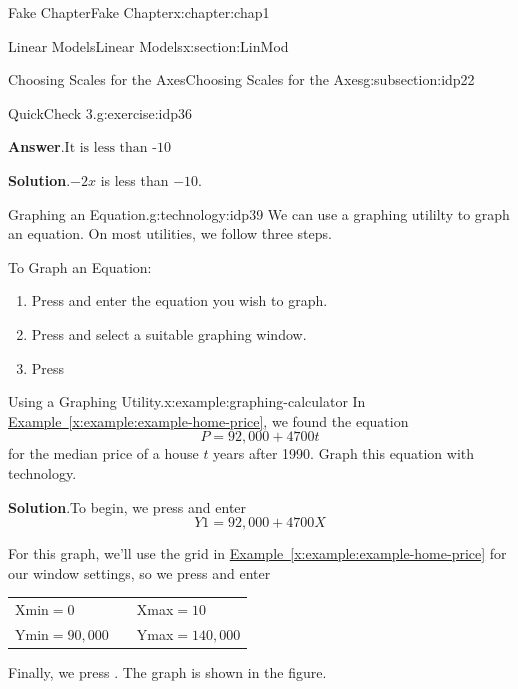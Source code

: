 \documentclass[oneside,10pt,]{book}
\newcommand{\blocktitlefont}{\relax}
\newcommand{\tabularfont}{\relax}
\newcommand{\xreffont}{\relax}
\numberwithin{equation}{section}
\newcommand{\kbd}[1]{\keys{{#1}}}
\begin{document}
\begin{chapterptx}{Fake Chapter}{}{Fake Chapter}{}{}{x:chapter:chap1}
\begin{sectionptx}{Linear Models}{}{Linear Models}{}{}{x:section:LinMod}
\begin{subsectionptx}{Choosing Scales for the Axes}{}{Choosing Scales for the Axes}{}{}{g:subsection:idp22}
\begin{inlineexercise}{QuickCheck 3.}{g:exercise:idp36}
\begin{itemize}[label=$\odot$,leftmargin=3em,]
\end{itemize}
%
\par\smallskip%
\noindent\textbf{\blocktitlefont Answer}.\hypertarget{g:answer:idp37}{}\quad{}\(\text{It is less than -10}\)%
\par\smallskip%
\noindent\textbf{\blocktitlefont Solution}.\hypertarget{g:solution:idp38}{}\quad{}\(-2x\) is less than \(-10\text{.}\)%
\end{inlineexercise}%
\begin{technology}{Graphing an Equation.}{g:technology:idp39}%
We can use a graphing utililty to graph an equation. On most utilities, we follow three steps.%
\par
To Graph an Equation:%
\par
%
\begin{enumerate}
\item{}Press \kbd{Y=} and enter the equation you wish to graph.%
\item{}Press \kbd{WINDOW} and select a suitable graphing window.%
\item{}Press \kbd{GRAPH}%
\end{enumerate}
%
\end{technology}
\begin{example}{Using a Graphing Utility.}{x:example:graphing-calculator}%
In \hyperref[x:example:example-home-price]{Example~{\xreffont\ref{x:example:example-home-price}}}, we found the equation%
\begin{equation*}
P = 92,000 + 4700t
\end{equation*}
for the median price of a house \(t\) years after 1990. Graph this equation with technology.%
\par\smallskip%
\noindent\textbf{\blocktitlefont Solution}.\hypertarget{g:solution:idp40}{}\quad{}To begin, we press \kbd{Y=} and enter%
\begin{equation*}
Y1 = 92,000 + 4700X
\end{equation*}
%
\par
For this graph, we’ll use the grid in \hyperref[x:example:example-home-price]{Example~{\xreffont\ref{x:example:example-home-price}}} for our window settings, so we press \kbd{WINDOW} and enter%
\begin{center}%
{\tabularfont%
\begin{tabular}{lll}
Xmin\(=0\)&&Xmax\(=10\)\tabularnewline[0pt]
Ymin\(=90,000\)&&Ymax\(=140,000\)
\end{tabular}
}%
\end{center}%
Finally, we press \kbd{GRAPH}. The graph is shown in the figure.%

\end{example}
\end{subsectionptx}
\end{sectionptx}
\end{chapterptx}
\end{document}

